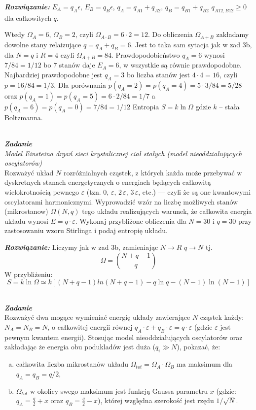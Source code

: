 \documentclass[11pt,a4paper]{article}
\newcounter{zadanie}\newcommand{\zadanie}[1][]{\addtocounter{zadanie}{1} ~\\  {\bf \emph{Zadanie \arabic{zadanie} #1 }} \\}
\begin{document}
{\bf \em Rozwiązanie:} $E_A=q_A\epsilon$, $E_B=q_B\epsilon$, $q_A=q_{A1}+q_{A2}$, $q_B=q_{B1}+q_{B2}$
$q_{A12,B12}\geq 0$ dla całkowitych $q$.

Wtedy $\Omega_A=6$, $\Omega_B=2$, czyli $\Omega_{A \cdot B}=6\cdot 2=12$.
Do obliczenia $\Omega_{A+B}$ zakładamy dowolne stany relaizujące $q=q_A+q_B=6$. Jest to taka sam sytacja jak w zad 3b, dla $N=q$ i $R=4$ 
czyli $\Omega_{A+B}=84$. Prawdopodobieństwo $q_A=6$ wynosi $7/84=1/12$ bo $7$ stanów daje $E_A=6$, w wszystkie są równie prawdopodobne.
Najbardziej prawdopodobne jest $q_A=3$ bo liczba stanów jest $4\cdot 4=16$, czyli $p=16/84=1/3$. Dla porównania $p(q_A=2)=p(q_A=4)=5\cdot 3/84=5/28$
oraz $p(q_A=1)=p(q_A=5)=6\cdot 2/84=1/7$ a $p(q_A=6)=p(q_A=0)=7/84=1/12$
Entropia $S=k\ln\Omega$ gdzie $k$ -- stała Boltzmanna.

\zadanie
{\em Model Einsteina drgań sieci krystalicznej ciał stałych  (model nieoddziałujących oscylatorów)}\\
Rozważyć układ $N$ rozróżnialnych cząstek, z których każda może przebywać w dyskretnych stanach energetycznych o energiach będących całkowitą wielokrotnością pewnego $\varepsilon$ (tzn. $0,\,\varepsilon,\,2\,\varepsilon,\,3\,\varepsilon$, etc.) --- czyli że są one kwantowymi oscylatorami harmonicznymi. Wyprowadzić wzór na liczbę możliwych stanów (mikrostanow) $\Omega (N, q)$ tego układu realizujących warunek, że całkowita energia układu wynosi $E = q\cdot\varepsilon$. 
Wykonaj przybliżone obliczenia dla $N = 30$ i $q = 30$ przy zastosowaniu wzoru Stirlinga i podaj entropię układu.
\vspace{5mm}

{\bf \em Rozwiązanie:} Liczymy jak w zad 3b, zamieniając $N\to R$ $q\to N$ tj.
\[
\Omega=\binom{N+q-1}{q}
\]
W przybliżeniu:
\[
S=k\ln\Omega\simeq k[(N+q-1)ln(N+q-1)- q\ln q-(N-1)\ln(N-1)]
\]

\zadanie
Rozważyć dwa mogące wymieniać energię układy zawierające $N$ cząstek każdy: $N_A = N_B = N$, 
o całkowitej energii równej $q_A\cdot\varepsilon + q_B\cdot\varepsilon = q\cdot\varepsilon$ (gdzie $\varepsilon$ jest pewnym kwantem energii). 
Stosując model nieoddziałujących oscylatorów oraz zakładając że energia obu podukladów jest duża ($q_i \gg N$), pokazać, że:
\begin{enumerate}[a)]
\item całkowita liczba mikrostanów układu 
      $\Omega_{tot} = \Omega_A \cdot \Omega_B$  
      ma maksimum dla $\displaystyle q_A = q_B = q/2$,
\item $\Omega_{tot}$ w okolicy swego maksimum jest funkcją Gaussa parametru 
      $x$ (gdzie: $\displaystyle q_A = \frac{q}{2} + x$ oraz\linebreak 
      $\displaystyle q_B = \frac{q}{2} - x$),
      której względna szerokość jest rzędu $1/\sqrt{N}$.
\end{enumerate}
\end{document}
